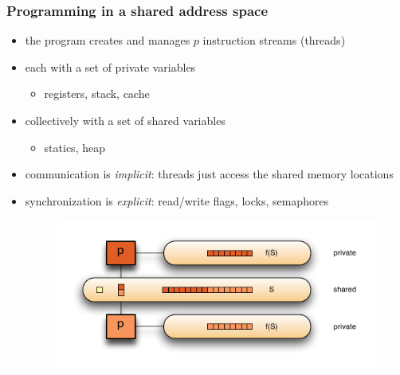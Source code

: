 \begin{frame}[fragile]
%
  \frametitle{Programming in a shared address space}
%
  \begin{itemize}
%
  \item the program creates and manages $p$ instruction streams (threads)
  \item each with a set of private variables
    \begin{itemize}
      \item registers, stack, cache
    \end{itemize}
%
  \item collectively with a set of shared variables
    \begin{itemize}
      \item statics, heap
    \end{itemize}
%
  \item communication is {\em implicit}: threads just access the shared memory locations
  \item synchronization is {\em explicit}: read/write flags, locks, semaphores
%
  \begin{figure}
    \centering
    \includegraphics[width=\linewidth]{figures/reduction-shared.pdf}
    \label{fig:reduction-shared}
  \end{figure}
%
  \end{itemize}
%
\end{frame}

